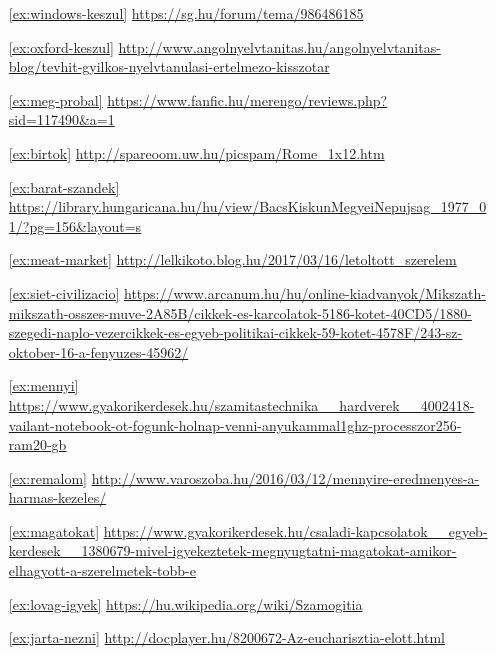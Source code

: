 {\sloppy
{\scriptsize
\begin{itemize}

    \item[\eqref{ex:windows-keszul}] \url{https://sg.hu/forum/tema/986486185}
    \item[\eqref{ex:oxford-keszul}] \url{http://www.angolnyelvtanitas.hu/angolnyelvtanitas-blog/tevhit-gyilkos-nyelvtanulasi-ertelmezo-kisszotar}
    \item[\eqref{ex:meg-probal}] \url{https://www.fanfic.hu/merengo/reviews.php?sid=117490&a=1}
    \item[\eqref{ex:birtok}] \url{http://spareoom.uw.hu/picspam/Rome_1x12.htm}
    \item[\eqref{ex:barat-szandek}]
        \url{https://library.hungaricana.hu/hu/view/BacsKiskunMegyeiNepujsag_1977_01/?pg=156\&layout=s}
    \item[\eqref{ex:meat-market}] \url{http://lelkikoto.blog.hu/2017/03/16/letoltott_szerelem}
    \item[\eqref{ex:siet-civilizacio}]
        \url{https://www.arcanum.hu/hu/online-kiadvanyok/Mikszath-mikszath-osszes-muve-2A85B/cikkek-es-karcolatok-5186-kotet-40CD5/1880-szegedi-naplo-vezercikkek-es-egyeb-politikai-cikkek-59-kotet-4578F/243-sz-oktober-16-a-fenyuzes-45962/}
    \item[\eqref{ex:mennyi}] \url{https://www.gyakorikerdesek.hu/szamitastechnika__hardverek__4002418-vailant-notebook-ot-fogunk-holnap-venni-anyukammal1ghz-processzor256-ram20-gb}
    \item[\eqref{ex:remalom}] \url{http://www.varoszoba.hu/2016/03/12/mennyire-eredmenyes-a-harmas-kezeles/}
    \item[\eqref{ex:magatokat}] \url{https://www.gyakorikerdesek.hu/csaladi-kapcsolatok__egyeb-kerdesek__1380679-mivel-igyekeztetek-megnyugtatni-magatokat-amikor-elhagyott-a-szerelmetek-tobb-e}
    \item[\eqref{ex:lovag-igyek}] \url{https://hu.wikipedia.org/wiki/Szamogitia}
    \item[\eqref{ex:jarta-nezni}] \url{http://docplayer.hu/8200672-Az-eucharisztia-elott.html}

\end{itemize}}}



